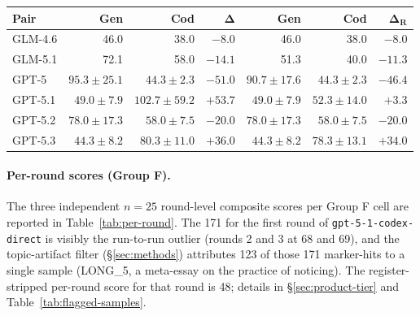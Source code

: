 \documentclass[11pt,a4paper]{article}
\begin{document}
\begin{table}[h]
\begin{tabular}{lrrrrrr}
\textbf{Pair} & \textbf{Gen} & \textbf{Cod} & $\boldsymbol{\Delta}$ & \textbf{Gen} & \textbf{Cod} & $\boldsymbol{\Delta_R}$ \\
\midrule
GLM-4.6 & 46.0 & 38.0 & $-8.0$ & 46.0 & 38.0 & $-8.0$ \\
GLM-5.1 & 72.1 & 58.0 & $-14.1$ & 51.3 & 40.0 & $-11.3$ \\
\midrule
GPT-5   & $95.3 \pm 25.1$ & $44.3 \pm 2.3$  & $-51.0$ & $90.7 \pm 17.6$ & $44.3 \pm 2.3$  & $-46.4$ \\
GPT-5.1 & $49.0 \pm 7.9$  & $102.7 \pm 59.2$ & $\mathbf{+53.7}$ & $49.0 \pm 7.9$  & $52.3 \pm 14.0$ & $\mathbf{+3.3}$ \\
GPT-5.2 & $78.0 \pm 17.3$ & $58.0 \pm 7.5$  & $-20.0$ & $78.0 \pm 17.3$ & $58.0 \pm 7.5$  & $-20.0$ \\
GPT-5.3 & $44.3 \pm 8.2$  & $80.3 \pm 11.0$ & $+36.0$ & $44.3 \pm 8.2$  & $78.3 \pm 13.1$ & $+34.0$ \\
\bottomrule
\end{tabular}
\end{table}

\paragraph{Per-round scores (Group F).} The three independent $n{=}25$ round-level composite scores per Group F cell are reported in Table~\ref{tab:per-round}. The 171 for the first round of \texttt{gpt-5-1\allowbreak-codex\allowbreak-direct} is visibly the run-to-run outlier (rounds 2 and 3 at 68 and 69), and the topic-artifact filter (\S\ref{sec:methods}) attributes 123 of those 171 marker-hits to a single sample (LONG\_5, a meta-essay on the practice of noticing). The register-stripped per-round score for that round is 48; details in \S\ref{sec:product-tier} and Table~\ref{tab:flagged-samples}.
\end{document}
